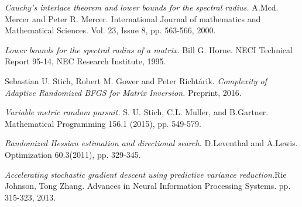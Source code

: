 \documentclass[12pt,conference,compsocconf]{IEEEtran}
\begin{document}
\begin{thebibliography}{1}
\textit{Cauchy's interlace theorem and lower bounds for the spectral radius.} A.Mcd. Mercer and Peter R. Mercer. International Journal of mathematics and Mathematical Sciences. Vol. 23, Issue 8, pp. 563-566, 2000.

\textit{Lower bounds for the spectral radius of a matrix.} Bill G. Horne. NECI Technical Report 95-14, NEC Research Institute, 1995.

Sebastian U. Stich, Robert M. Gower and Peter Richt\'arik.
\textit{Complexity of Adaptive Randomized BFGS for Matrix Inversion.}
Preprint, 2016.

\textit{Variable metric random pursuit.} S. U. Stich, C.L. Muller, and B.Gartner. Mathematical
Programming 156.1 (2015), pp. 549-579.

\textit{Randomized Hessian estimation and directional search.} D.Leventhal and A.Lewis. Optimization 60.3(2011), pp. 329-345.

\textit{Accelerating stochastic gradient descent using predictive variance reduction.}Rie Johnson, Tong Zhang. Advances in Neural Information Processing Systems. pp. 315-323, 2013.

\end{thebibliography}
\end{document}

